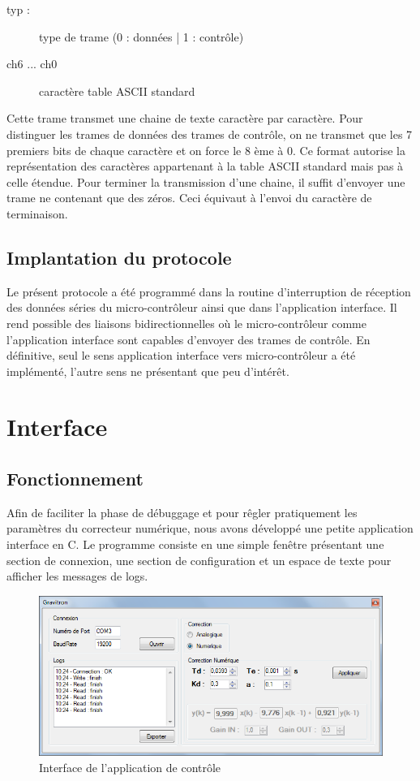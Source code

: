 \documentclass[11pt, french]{article} %
\begin{document}
\begin{itemize}
		\begin{description}
			\item[typ :] type de trame (0 : données | 1 : contrôle)
			\item[ch6 ... ch0] caractère table ASCII standard
		\end{description}

		Cette trame transmet une chaine de texte caractère par caractère. Pour distinguer les trames de données des trames de contrôle, on ne transmet que les 7 premiers bits de chaque caractère et on force le 8 ème à 0. Ce format autorise la représentation des caractères appartenant à la table ASCII standard mais pas à celle étendue. Pour terminer la transmission d'une chaine, il suffit d'envoyer une trame ne contenant que des zéros. Ceci équivaut à l'envoi du caractère de terminaison.

\end{itemize}

\subsection{Implantation du protocole}
Le présent protocole a été programmé dans la routine d'interruption de réception des données séries du micro-contrôleur ainsi que dans l'application interface. Il rend possible des liaisons bidirectionnelles où le micro-contrôleur comme l'application interface sont capables d'envoyer des trames de contrôle. En définitive, seul le sens application interface vers micro-contrôleur a été implémenté, l'autre sens ne présentant que peu d'intérêt.

\section{Interface}
\subsection{Fonctionnement}
Afin de faciliter la phase de débuggage et pour rêgler pratiquement les paramètres du correcteur numérique, nous avons développé une petite application interface en C. Le programme consiste en une simple fenêtre présentant une section de connexion, une section de configuration et un espace de texte pour afficher les messages de logs.

\begin{figure}[h!]
	\centering
	\includegraphics[width = 12cm]{SolutionNumerique/IHM.png} 
	\caption{Interface de l'application de contrôle}
\end{figure}
\end{document}
